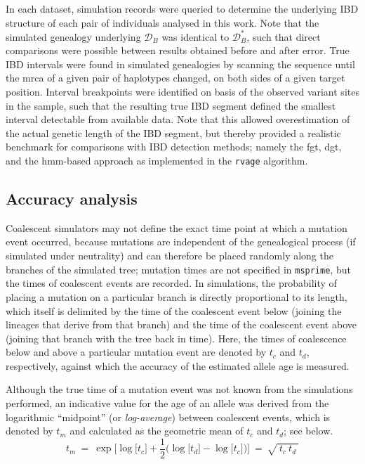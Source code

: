 In each dataset, simulation records were queried to determine the underlying IBD structure of each pair of individuals analysed in this work.
Note that the simulated genealogy underlying $\mathcal{D}_B$ was identical to $\mathcal{D}_B^{\ast}$, such that direct comparisons were possible between results obtained before and after error.
True IBD intervals were found in simulated genealogies by scanning the sequence until the \gls{mrca} of a given pair of haplotypes changed, on both sides of a given target position.
Interval breakpoints were identified on basis of the observed variant sites in the sample, such that the resulting true IBD segment defined the smallest interval detectable from available data.
Note that this allowed overestimation of the actual genetic length of the IBD segment, but thereby provided a realistic benchmark for comparisons with IBD detection methods; namely the \gls{fgt}, \gls{dgt}, and the \gls{hmm}-based approach as implemented in the \texttt{rvage} algorithm.


%
\subsection{Accuracy analysis}
%

Coalescent simulators may not define the exact time point at which a mutation event occurred, because mutations are independent of the genealogical process (if simulated under neutrality) and can therefore be placed randomly along the branches of the simulated tree; \ie mutation times are not specified in \texttt{msprime}, but the times of coalescent events are recorded.
In simulations, the probability of placing a mutation on a particular branch is directly proportional to its length, which itself is delimited by the time of the coalescent event below (joining the lineages that derive from that branch) and the time of the coalescent event above (joining that branch with the tree back in time).
Here, the times of coalescence below and above a particular mutation event are denoted by $t_c$ and $t_d$, respectively, against which the accuracy of the estimated allele age is measured.

Although the true time of a mutation event was not known from the simulations performed, an indicative value for the age of an allele was derived from the logarithmic ``midpoint'' (or \emph{log-average}) between coalescent events, which is denoted by $t_m$ and calculated as the geometric mean of $t_c$ and $t_d$; see below.
\begin{equation}
	t_m ~=~
	\exp \bigg[ \log \big[ t_c \big] + \frac{1}{2} \bigg( \log \big[ t_d \big] - \log \big[t_c \big] \bigg) \bigg] ~=~
	\sqrt{~t_c ~ t_d~}
\end{equation}

